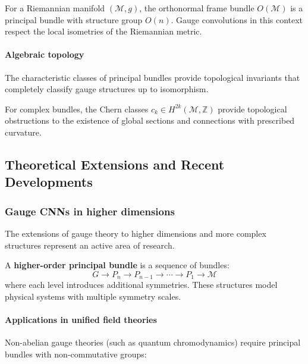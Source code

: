 \begin{example}
For a Riemannian manifold $(\mathcal{M}, g)$, the orthonormal frame bundle $O(\mathcal{M})$ is a principal bundle with structure group $O(n)$. Gauge convolutions in this context respect the local isometries of the Riemannian metric.
\end{example}

\paragraph{Algebraic topology}
The characteristic classes of principal bundles provide topological invariants that completely classify gauge structures up to isomorphism.

\begin{example}
For complex bundles, the Chern classes $c_k \in H^{2k}(\mathcal{M}, \mathbb{Z})$ provide topological obstructions to the existence of global sections and connections with prescribed curvature.
\end{example}

\subsection{Theoretical Extensions and Recent Developments}

\subsubsection{Gauge CNNs in higher dimensions}

The extensions of gauge theory to higher dimensions and more complex structures represent an active area of research.

\begin{definition}
A \textbf{higher-order principal bundle} is a sequence of bundles:
\begin{equation}
G \to P_n \to P_{n-1} \to \cdots \to P_1 \to \mathcal{M}
\end{equation}
where each level introduces additional symmetries. These structures model physical systems with multiple symmetry scales.
\end{definition}

\paragraph{Applications in unified field theories}
Non-abelian gauge theories (such as quantum chromodynamics) require principal bundles with non-commutative groups:


